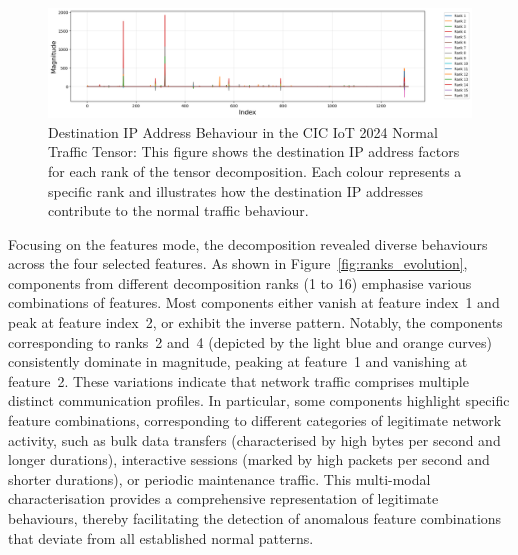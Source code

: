 \documentclass[preprint,12pt,authoryear]{elsarticle}
\begin{document}
\begin{figure}[H]
    \centering
    \includegraphics[width=1.2\linewidth]{Destination IP mode.png}
   \caption{Destination IP Address Behaviour in the CIC IoT 2024 Normal Traffic Tensor: This figure shows the destination IP address factors for each rank of the tensor decomposition. Each colour represents a specific rank and illustrates how the destination IP addresses contribute to the normal traffic behaviour.}
\end{figure}

Focusing on the features mode, the decomposition revealed diverse behaviours across the four selected features. As shown in Figure~\ref{fig:ranks_evolution}, components from different decomposition ranks (1 to 16) emphasise various combinations of features. Most components either vanish at feature index~1 and peak at feature index~2, or exhibit the inverse pattern. Notably, the components corresponding to ranks~2 and~4 (depicted by the light blue and orange curves) consistently dominate in magnitude, peaking at feature~1 and vanishing at feature~2. These variations indicate that network traffic comprises multiple distinct communication profiles. In particular, some components highlight specific feature combinations, corresponding to different categories of legitimate network activity, such as bulk data transfers (characterised by high bytes per second and longer durations), interactive sessions (marked by high packets per second and shorter durations), or periodic maintenance traffic. This multi-modal characterisation provides a comprehensive representation of legitimate behaviours, thereby facilitating the detection of anomalous feature combinations that deviate from all established normal patterns.
\end{document}
